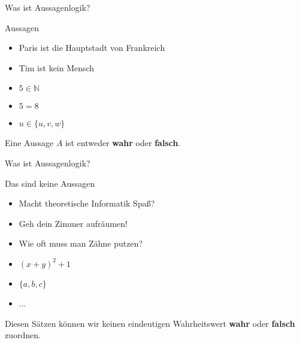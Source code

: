 %
%
%
%

\begin{frame}[fragile]{Was ist Aussagenlogik?}
    \begin{alertblock}{Aussagen}
    \begin{itemize}
        \item Paris ist die Hauptstadt von Frankreich
        \item Tim ist kein Mensch
        \item $5 \in \mathbb{N}$
        \item $5 = 8$
        \item $u \in \{u, v, w\}$
    \end{itemize}
    \end{alertblock}
    Eine Aussage $A$ ist entweder \textbf{wahr} oder \textbf{falsch}.
\end{frame}

\begin{frame}[fragile]{Was ist Aussagenlogik?}
    \begin{alertblock}{Das sind keine Aussagen}
    \begin{itemize}
        \item Macht theoretische Informatik Spaß?
        \item Geh dein Zimmer aufräumen!
        \item Wie oft muss man Zähne putzen?
        \item $(x+y)^2+1$
        \item $\{a,b,c\}$
        \item ...
    \end{itemize}
    \end{alertblock}
    Diesen Sätzen können wir keinen eindeutigen Wahrheitswert \textbf{wahr} oder \textbf{falsch} zuordnen.
\end{frame}


